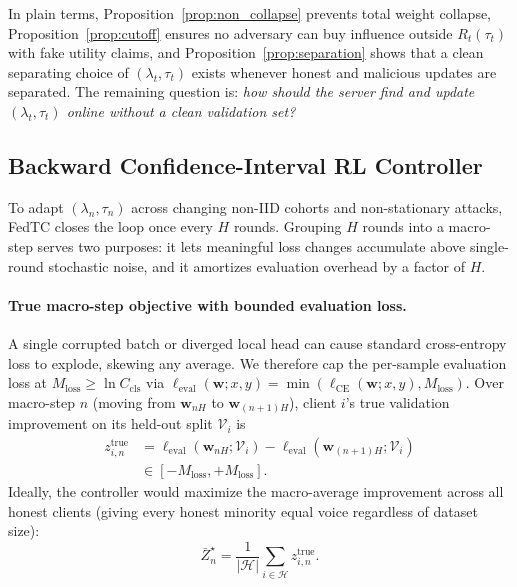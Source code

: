 In plain terms, Proposition~\ref{prop:non_collapse} prevents total weight collapse, Proposition~\ref{prop:cutoff} ensures no adversary can buy influence outside $R_t(\tau_t)$ with fake utility claims, and Proposition~\ref{prop:separation} shows that a clean separating choice of $(\lambda_t, \tau_t)$ exists whenever honest and malicious updates are separated. The remaining question is: \emph{how should the server find and update $(\lambda_t, \tau_t)$ online without a clean validation set?}

\subsection{Backward Confidence-Interval RL Controller}
\label{sec:rl_meta}

To adapt $(\lambda_n, \tau_n)$ across changing non-IID cohorts and non-stationary attacks, FedTC closes the loop once every $H$ rounds. Grouping $H$ rounds into a macro-step serves two purposes: it lets meaningful loss changes accumulate above single-round stochastic noise, and it amortizes evaluation overhead by a factor of $H$.

\paragraph{True macro-step objective with bounded evaluation loss.}
A single corrupted batch or diverged local head can cause standard cross-entropy loss to explode, skewing any average. We therefore cap the per-sample evaluation loss at $M_{\mathrm{loss}} \ge \ln C_{\mathrm{cls}}$ via $\ell_{\mathrm{eval}}(\mathbf{w}; x, y) = \min(\ell_{\mathrm{CE}}(\mathbf{w}; x, y), M_{\mathrm{loss}})$. Over macro-step $n$ (moving from $\mathbf{w}_{nH}$ to $\mathbf{w}_{(n+1)H}$), client $i$'s true validation improvement on its held-out split $\mathcal{V}_i$ is
\begin{equation}
\begin{aligned}
    z_{i,n}^{\mathrm{true}} &= \ell_{\mathrm{eval}}(\mathbf{w}_{nH}; \mathcal{V}_i) - \ell_{\mathrm{eval}}(\mathbf{w}_{(n+1)H}; \mathcal{V}_i) \\
    &\in [-M_{\mathrm{loss}}, +M_{\mathrm{loss}}].
\end{aligned}
\end{equation}
Ideally, the controller would maximize the macro-average improvement across all honest clients (giving every honest minority equal voice regardless of dataset size):
\begin{equation}
    \bar{Z}_n^\star = \frac{1}{|\mathcal{H}|} \sum_{i\in\mathcal{H}} z_{i,n}^{\mathrm{true}}.
    \label{eq:true_target}
\end{equation}

